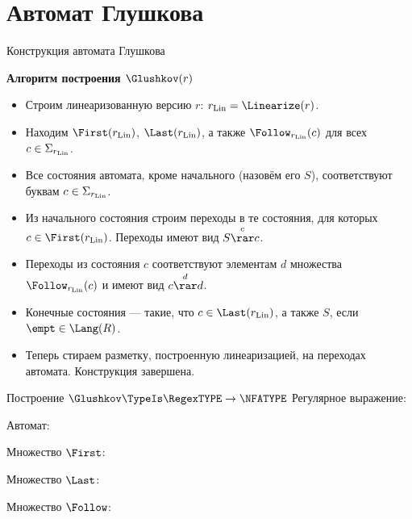 \section{Автомат Глушкова}
\begin{frame}{Конструкция автомата Глушкова}
  \begin{block}{\bf Алгоритм построения $\Glushkov(r)$}
    \begin{itemize}
      \item Строим линеаризованную версию $r$: $r_{\rm Lin} =\Linearize(r)$.
      \item Находим $\First(r_{\rm Lin})$, $\Last(r_{\rm Lin})$, а также $\Follow_{r_{\rm Lin}}(c)$ для всех $c\in\Sigma_{r_{\rm Lin}}$.
      \item Все состояния автомата, кроме начального (назовём его $S$), соответствуют буквам $c\in\Sigma_{r_{\rm Lin}}$.
      \item Из начального состояния строим переходы в те состояния, для которых $c\in\First(r_{\rm Lin})$. Переходы имеют вид $S\overset{c}{\rar}{c}$.
      \item Переходы из состояния $c$ соответствуют элементам $d$ множества $\Follow_{r_{\rm Lin}}(c)$ и имеют вид $c\overset{d}{\rar}{d}$.
      \item Конечные состояния --- такие, что $c\in\Last(r_{\rm Lin})$, а также $S$, если $\empt\in\Lang(R)$.
      \item Теперь стираем разметку, построенную линеаризацией, на переходах автомата. Конструкция завершена.
    \end{itemize}
  \end{block} %
\end{frame}
\begin{frame}{Построение $\Glushkov\TypeIs\RegexTYPE\to\NFATYPE$}
	Регулярное выражение:

	Автомат:


	Множество $\First$:


	Множество $\Last$:


	Множество $\Follow$:


\end{frame}

